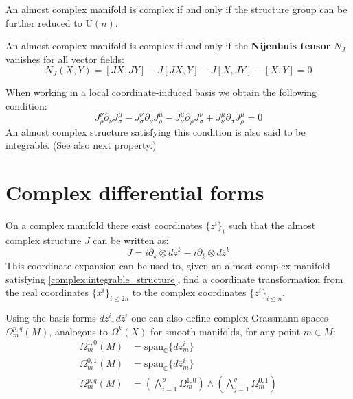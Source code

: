 	\begin{property}
		An almost complex manifold is complex if and only if the structure group can be further reduced to U$(n)$.
	\end{property}
	
	\begin{theorem}
		An almost complex manifold is complex if and only if the \textbf{Nijenhuis tensor} $N_J$ vanishes for all vector fields:
		\begin{equation}
			\label{complex:integrable_structure}
			N_J(X, Y) = [JX, JY] - J[JX, Y] - J[X, JY] - [X, Y] = 0
		\end{equation}
	\end{theorem}
	When working in a local coordinate-induced basis we obtain the following condition:
	\begin{equation}
		J_\rho^\nu\partial_\nu J_\sigma^\mu - J_\sigma^\nu\partial_\nu J_\rho^\mu - J_\nu^\mu\partial_\rho J_\sigma^\nu + J_\nu^\mu\partial_\sigma J_\rho^\mu = 0
	\end{equation}
	An almost complex structure satisfying this condition is also said to be integrable. (See also next property.)
	
\section{Complex differential forms}
	
	\begin{property}
		On a complex manifold there exist coordinates $\{z^i\}_i$ such that the almost complex structure $J$ can be written as:
		\begin{equation}
			J = i\partial_k\otimes dz^k - i\partial_{\overline{k}}\otimes d\overline{z}^k
		\end{equation}
		This coordinate expansion can be used to, given an almost complex manifold satisfying \ref{complex:integrable_structure}, find a coordinate transformation from the real coordinates $\{x^i\}_{i\leq2n}$ to the complex coordinates $\{z^i\}_{i\leq n}$.
	\end{property}

	Using the basis forms $dz^i, d\overline{z}^i$ one can also define complex Grassmann spaces $\Omega^{p, q}_m(M)$, analogous to $\Omega^k(X)$ for smooth manifolds, for any point $m\in M$:
	\begin{align}
		\Omega^{1, 0}_m(M) &= \text{span}_{\mathbb{C}}\{dz^i_m\}\\
		\Omega^{0, 1}_m(M) &= \text{span}_{\mathbb{C}}\{d\overline{z}^i_m\}\\
		\Omega^{p, q}_m(M) &= \left(\bigwedge_{i=1}^p\Omega^{1, 0}_m\right)\wedge\left(\bigwedge_{j=1}^q\Omega^{0, 1}_m\right)
	\end{align}
	
